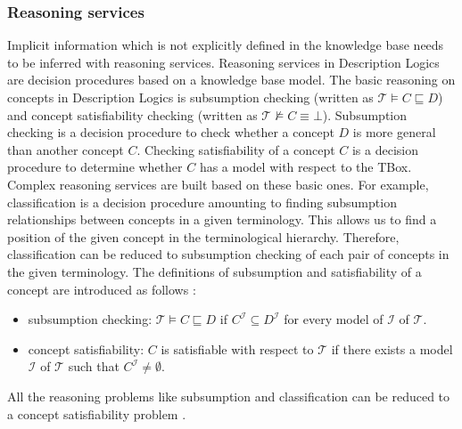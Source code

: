 \documentclass{article}
\begin{document}
\subsubsection{Reasoning services}
Implicit information which is not explicitly defined in the knowledge base needs to be inferred with reasoning services.
Reasoning services in Description Logics are decision procedures based on a knowledge base model. 
The basic reasoning on concepts in Description Logics is subsumption checking (written as $\mathcal{T}\vDash C\sqsubseteq D$) and 
concept satisfiability checking (written as $\mathcal{T}\nvDash C\equiv \bot$).
Subsumption checking is a decision procedure to check whether a concept $D$ is more general than another concept $C$.
Checking satisfiability of a concept $C$ is a decision procedure to determine whether $C$ has a model with respect to the TBox.
Complex reasoning services are built based on these basic ones. For example, classification is a decision procedure amounting to finding subsumption 
relationships between concepts in a given terminology. This allows us to find a position of the given concept in the terminological hierarchy.
Therefore, classification can be reduced to subsumption checking of each pair of concepts in the given terminology.
The definitions of subsumption and satisfiability of a concept are introduced as follows \cite{baader2003description}:
\begin{itemize}
\item subsumption checking: $\mathcal{T}\vDash C\sqsubseteq D$ if $C^\mathcal{I}\subseteq D^\mathcal{I}$ for every model of $\mathcal{I}$ of $\mathcal{T}$.
\item concept satisfiability: $C$ is satisfiable with respect to $\mathcal{T}$ if there exists a model $\mathcal{I}$ of $\mathcal{T}$ such that $C^\mathcal{I}\neq \emptyset$.
\end{itemize}
All the reasoning problems like subsumption and classification can be reduced to a concept satisfiability problem \cite{baader2003description}.
\end{document}
